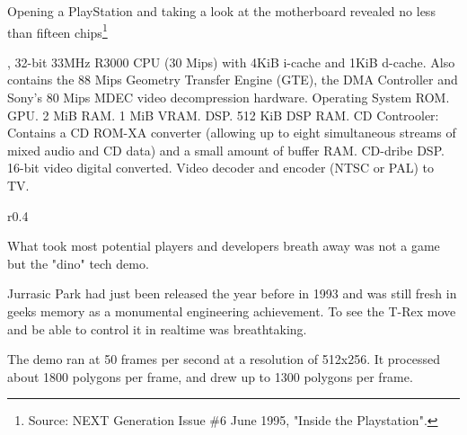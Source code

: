 \par
Opening a PlayStation and taking a look at the motherboard revealed no less than fifteen chips\footnote{Source: NEXT Generation Issue \#6 June 1995, "Inside the Playstation".}\\
\par
{}, 32-bit 33MHz R3000 CPU (30 Mips) with  4KiB i-cache and 1KiB d-cache. Also contains the 88 Mips Geometry Transfer Engine (GTE), the DMA Controller and Sony's 80 Mips MDEC video decompression hardware.
 Operating System ROM.
 GPU.
 2 MiB RAM.
 1 MiB VRAM.
 DSP.
 512 KiB DSP RAM.
 CD Controoler: Contains a CD ROM-XA converter (allowing up to eight simultaneous streams of mixed audio and CD data) and a small amount of buffer RAM.
 CD-dribe DSP.
 16-bit video digital converted.
 Video decoder and encoder (NTSC or PAL) to TV.


\par
\begin{wrapfigure}[10]{r}{0.4\textwidth}{
\centering {}}
\end{wrapfigure}
What took most potential players and developers breath away was not a game but the "dino" tech demo.\\
\par
 Jurrasic Park had just been released the year before in 1993 and was still fresh in geeks memory as a monumental engineering achievement. To see the T-Rex move and be able to control it in realtime was breathtaking.\\
 \par
 The demo ran at 50 frames per second at a resolution of 512x256. It processed about 1800 polygons per frame, and drew up to 1300 polygons per frame. 



